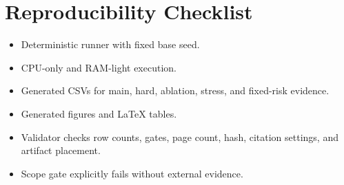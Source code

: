 \documentclass{article}
\begin{document}
\section{Reproducibility Checklist}
\begin{itemize}
\item Deterministic runner with fixed base seed.
\item CPU-only and RAM-light execution.
\item Generated CSVs for main, hard, ablation, stress, and fixed-risk evidence.
\item Generated figures and LaTeX tables.
\item Validator checks row counts, gates, page count, hash, citation settings, and artifact placement.
\item Scope gate explicitly fails without external evidence.
\end{itemize}
\begingroup
\raggedright


\endgroup
\end{document}
